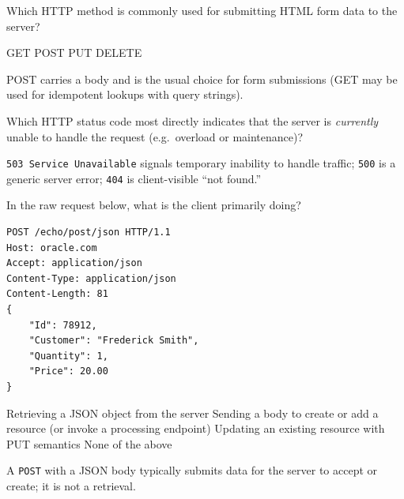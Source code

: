\question[4]
Which HTTP method is commonly used for submitting HTML form data to the server?
\begin{choices}
  \choice GET
  \CorrectChoice POST
  \choice PUT
  \choice DELETE
\end{choices}
\begin{solution}
  POST carries a body and is the usual choice for form submissions (GET may be used for idempotent lookups with query strings).
\end{solution}



\question[4]
Which HTTP status code most directly indicates that the server is \emph{currently} unable to handle the request (e.g.\ overload or maintenance)?
\begin{choices}
\end{choices}
\begin{solution}
  \texttt{503 Service Unavailable} signals temporary inability to handle traffic; \texttt{500} is a generic server error; \texttt{404} is client-visible ``not found.''
\end{solution}


\newpage

\question[4]
In the raw request below, what is the client primarily doing?
\begin{lstlisting}[style=http]
POST /echo/post/json HTTP/1.1
Host: oracle.com
Accept: application/json
Content-Type: application/json
Content-Length: 81
{
    "Id": 78912,
    "Customer": "Frederick Smith",
    "Quantity": 1,
    "Price": 20.00
}
\end{lstlisting}
\begin{choices}
  \choice Retrieving a JSON object from the server
  \CorrectChoice Sending a body to create or add a resource (or invoke a processing endpoint)
  \choice Updating an existing resource with PUT semantics
  \choice None of the above
\end{choices}
\begin{solution}
  A \texttt{POST} with a JSON body typically submits data for the server to accept or create; it is not a retrieval.
\end{solution}



